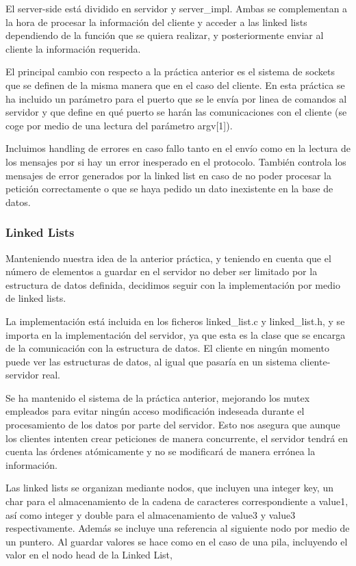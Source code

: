 El server-side está dividido en servidor y server\_impl. Ambas se complementan a la hora de procesar la información del cliente y acceder a las linked lists dependiendo de la función que se quiera realizar, y posteriormente enviar al cliente la información requerida.

El principal cambio con respecto a la práctica anterior es el sistema de sockets que se definen de la misma manera que en el caso del cliente. En esta práctica se ha incluido un parámetro para el puerto que se le envía por linea de comandos al servidor y que define en qué puerto se harán las comunicaciones con el cliente (se coge por medio de una lectura del parámetro argv[1]).

Incluimos handling de errores en caso fallo tanto en el envío como en la lectura de los mensajes por si hay un error inesperado en el protocolo. También controla los mensajes de error generados por la linked list en caso de no poder procesar la petición correctamente o que se haya pedido un dato inexistente en la base de datos.

\subsubsection{Linked Lists}
Manteniendo nuestra idea de la anterior práctica, y teniendo en cuenta que el número de elementos a guardar en el servidor no deber ser limitado por la estructura de datos definida, decidimos seguir con la implementación por medio de linked lists. 

La implementación está incluida en los ficheros linked\_list.c y linked\_list.h, y se importa en la implementación del servidor, ya que esta es la clase que se encarga de la comunicación con la estructura de datos. El cliente en ningún momento puede ver las estructuras de datos, al igual que pasaría en un sistema cliente-servidor real.

Se ha mantenido el sistema de la práctica anterior, mejorando los mutex empleados para evitar ningún acceso  modificación indeseada durante el procesamiento de los datos por parte del servidor. Esto nos asegura que aunque los clientes intenten crear peticiones de manera concurrente, el servidor tendrá en cuenta las órdenes atómicamente y no se modificará de manera errónea la información.

Las linked lists se organizan mediante nodos, que incluyen una integer key, un char para el almacenamiento de la cadena de caracteres correspondiente a value1, así como integer y double para el almacenamiento de value3 y value3 respectivamente. Además se incluye una referencia al siguiente nodo por medio de un puntero. Al guardar valores se hace como en el caso de una pila, incluyendo el valor en el nodo head de la Linked List,

